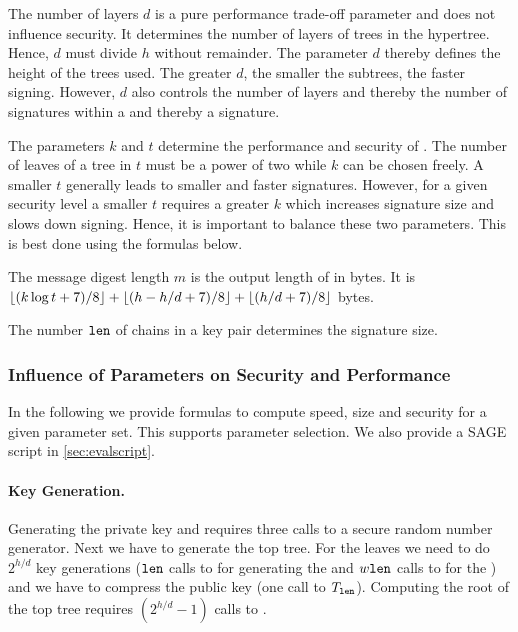 The number of layers $d$ is a pure performance trade-off parameter and does not
influence security. It determines the number of layers of \xmss trees in the 
hypertree. Hence, $d$ must divide $h$ without remainder. The parameter $d$ 
thereby defines the height of the \xmss trees used. The greater $d$, the smaller
the subtrees, the faster signing. However, $d$ also controls the number of 
layers and thereby the number of \wotsp signatures within a \hyper and thereby 
a \spx signature. 

The parameters $k$ and $t$ determine the performance and security of \fors. The 
number of leaves of a tree in \fors $t$ must be a power of two while $k$ can be
chosen freely. A smaller $t$ generally leads to smaller and faster signatures.
However, for a given security level a smaller $t$ requires a greater $k$
which increases signature size and slows down signing. Hence, it is important 
to balance these two parameters. This is best done using the formulas below.

The message digest length $m$ is the output length of \sphincsHmsg in bytes. 
It is $\lfloor(k\log t +7)/ 8\rfloor + \lfloor(h - h/d +7)/ 8\rfloor + \lfloor(h / d +7)/ 8\rfloor$ 
bytes. 

The number $\texttt{len}$ of chains in a \wotsp key pair determines the \wotsp signature size.

\subsubsection{Influence of Parameters on Security and Performance}
\label{sec:generic-estimates}
In the following we provide formulas to compute speed, size and security for 
a given \spx parameter set. This supports parameter selection. We also provide
a SAGE script in \autoref{sec:evalscript}.

\paragraph{Key Generation.} Generating the \spx private key and \pseed requires 
three calls to a secure random number generator. Next we have to generate the 
top tree. For the leaves we need to do $2^{h/d}$ \wotsp key generations ($\texttt{len}$ 
calls to \sphincsPRF for generating the \sk and $w \texttt{len}$ calls to \sphincsF for the \pk) 
and we have to compress the \wotsp public key (one call to $T_\texttt{len}$). Computing 
the root of the top tree requires $(2^{h/d} - 1)$ calls to \sphincsH.

